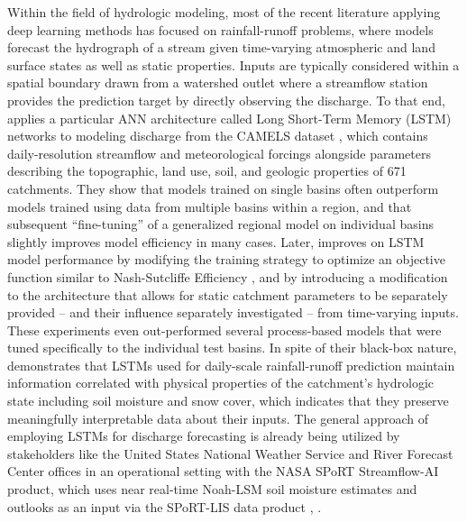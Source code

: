 Within the field of hydrologic modeling, most of the recent literature applying deep learning methods has focused on rainfall-runoff problems, where models forecast the hydrograph of a stream given time-varying atmospheric and land surface states as well as static properties. Inputs are typically considered within a spatial boundary drawn from a watershed outlet where a streamflow station provides the prediction target by directly observing the discharge. To that end, \parencite{kratzert_rainfallrunoff_2018} applies a particular ANN architecture called Long Short-Term Memory (LSTM) networks to modeling discharge from the CAMELS dataset \parencite{addor_camels_2017}, which contains daily-resolution streamflow and meteorological forcings alongside parameters describing the topographic, land use, soil, and geologic properties of 671 catchments. They show that models trained on single basins often outperform models trained using data from multiple basins within a region, and that subsequent ``fine-tuning'' of a generalized regional model on individual basins slightly improves model efficiency in many cases. Later, \parencite{kratzert_towards_2019} improves on LSTM model performance by modifying the training strategy to optimize an objective function similar to Nash-Sutcliffe Efficiency \parencite{nash_river_1970}, and by introducing a modification to the architecture that allows for static catchment parameters to be separately provided -- and their influence separately investigated -- from time-varying inputs. These experiments even out-performed several process-based models that were tuned specifically to the individual test basins. In spite of their black-box nature, \parencite{lees_hydrological_2022} demonstrates that LSTMs used for daily-scale rainfall-runoff prediction maintain information correlated with physical properties of the catchment's hydrologic state including soil moisture and snow cover, which indicates that they preserve meaningfully interpretable data about their inputs. The general approach of employing LSTMs for discharge forecasting is already being utilized by stakeholders like the United States National Weather Service and River Forecast Center offices in an operational setting with the NASA SPoRT Streamflow-AI product, which uses near real-time Noah-LSM soil moisture estimates and outlooks as an input via the SPoRT-LIS data product \parencite{white_nasa_2025}, \parencite{case_nasa_2022}.

